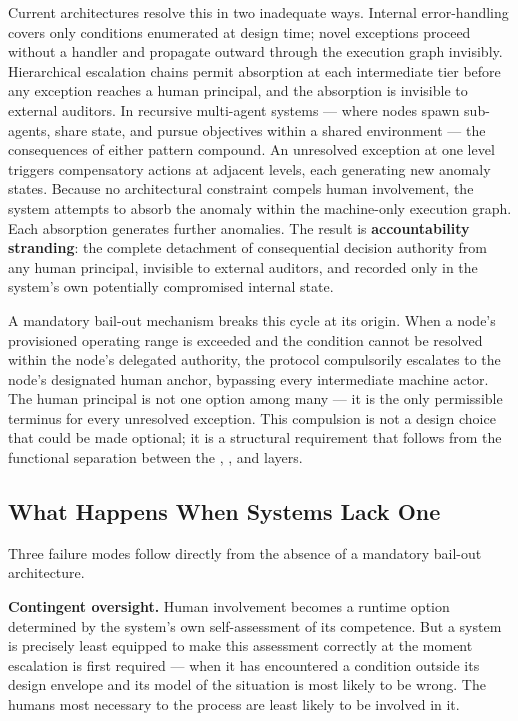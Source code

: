 Current architectures resolve this in two inadequate ways. Internal error-handling covers only conditions enumerated at design time; novel exceptions proceed without a handler and propagate outward through the execution graph invisibly. Hierarchical escalation chains permit absorption at each intermediate tier before any exception reaches a human principal, and the absorption is invisible to external auditors. In recursive multi-agent systems — where nodes spawn sub-agents, share state, and pursue objectives within a shared environment — the consequences of either pattern compound. An unresolved exception at one level triggers compensatory actions at adjacent levels, each generating new anomaly states. Because no architectural constraint compels human involvement, the system attempts to absorb the anomaly within the machine-only execution graph. Each absorption generates further anomalies. The result is \textbf{accountability stranding}: the complete detachment of consequential decision authority from any human principal, invisible to external auditors, and recorded only in the system's own potentially compromised internal state.

A mandatory bail-out mechanism breaks this cycle at its origin. When a node's provisioned operating range is exceeded and the condition cannot be resolved within the node's delegated authority, the protocol compulsorily escalates to the node's designated human anchor, bypassing every intermediate machine actor. The human principal is not one option among many — it is the only permissible terminus for every unresolved exception. This compulsion is not a design choice that could be made optional; it is a structural requirement that follows from the functional separation between the \purpose{}, \bounds{}, and \fact{} layers.

\subsection{What Happens When Systems Lack One}
\label{sec:failure-modes}

Three failure modes follow directly from the absence of a mandatory bail-out architecture.

\textbf{Contingent oversight.} Human involvement becomes a runtime option determined by the system's own self-assessment of its competence. But a system is precisely least equipped to make this assessment correctly at the moment escalation is first required — when it has encountered a condition outside its design envelope and its model of the situation is most likely to be wrong. The humans most necessary to the process are least likely to be involved in it.

